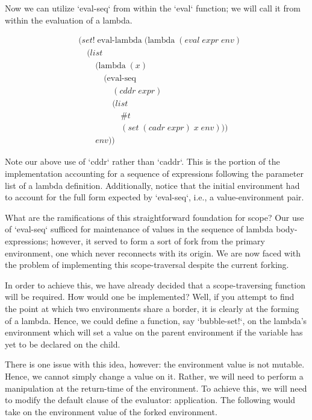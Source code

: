 Now we can utilize `eval-seq` from within the `eval` function; we will call
it from within the evaluation of a lambda.

\begin{align*}
& (set! \; \text{eval-lambda} \; (\text{lambda} \; (eval \; expr \; env)
\\& \quad (list
\\& \qquad (\text{lambda} \; (x) \; 
\\& \qquad \quad (\text{eval-seq} \; 
\\& \qquad \qquad (cddr \; expr) \; 
\\& \qquad \qquad (list
\\& \qquad \qquad \quad \#t
\\& \qquad \qquad \quad (set \; (cadr \; expr) \; x \; env)))
\\& \qquad env))
\end{align*}

Note our above use of `cddr` rather than `caddr`. This is the portion of the
implementation accounting for a sequence of expressions following the
parameter list of a lambda definition. Additionally, notice that the initial
environment had to account for the full form expected by `eval-seq`, i.e.,
a value-environment pair.

What are the ramifications of this straightforward foundation for scope? Our
use of `eval-seq` sufficed for maintenance of values in the sequence of 
lambda body-expressions; however, it served to form a sort of fork from the
primary environment, one which never reconnects with its origin. We are now
faced with the problem of implementing this scope-traversal despite the
current forking.

In order to achieve this, we have already decided that a scope-traversing
function will be required. How would one be implemented? Well, if you attempt
to find the point at which two environments share a border, it is clearly at
the forming of a lambda. Hence, we could define a function, say 
`bubble-set!`, on the lambda's environment which will set a value on the
parent environment if the variable has yet to be declared on the child.

There is one issue with this idea, however: the environment value is not
mutable. Hence, we cannot simply change a value on it. Rather, we will need
to perform a manipulation at the return-time of the environment. To achieve
this, we will need to modify the default clause of the evaluator: 
application. The following would take on the environment value of the forked
environment.

